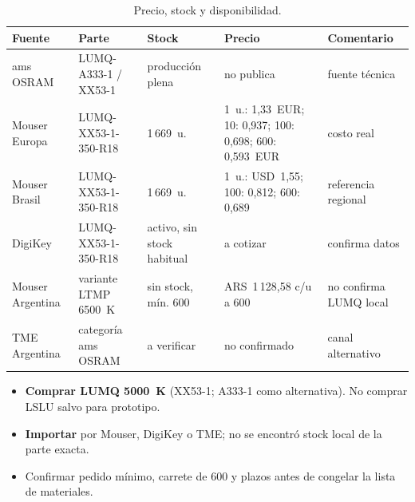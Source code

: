 \documentclass[11pt,a4paper]{article}
\begin{document}
\begin{table}[H]\centering\scriptsize\setlength{\tabcolsep}{3pt}
\begin{tabular}{p{2.1cm} p{3.3cm} p{2.4cm} p{4.2cm} p{2.4cm}}
\toprule
Fuente & Parte & Stock & Precio & Comentario\\
\midrule
ams OSRAM & LUMQ-A333-1 / XX53-1 & producción plena & no publica & fuente técnica\\
Mouser Europa & LUMQ-XX53-1-350-R18 & 1\,669~u. & 1~u.: 1,33~EUR; 10: 0,937; 100: 0,698; 600: 0,593~EUR & costo real\\
Mouser Brasil & LUMQ-XX53-1-350-R18 & 1\,669~u. & 1~u.: USD~1,55; 100: 0,812; 600: 0,689 & referencia regional\\
DigiKey & LUMQ-XX53-1-350-R18 & activo, sin stock habitual & a cotizar & confirma datos\\
Mouser Argentina & variante LTMP 6500~K & sin stock, mín. 600 & ARS~1\,128,58 c/u a 600 & no confirma LUMQ local\\
TME Argentina & categoría ams OSRAM & a verificar & no confirmado & canal alternativo\\
\bottomrule
\end{tabular}
\caption{Precio, stock y disponibilidad.}
\end{table}

\begin{itemize}
  \item \textbf{Comprar LUMQ 5000~K} (XX53-1; A333-1 como alternativa). No comprar LSLU salvo para prototipo.
  \item \textbf{Importar} por Mouser, DigiKey o TME; no se encontró stock local de la parte exacta.
  \item Confirmar pedido mínimo, carrete de 600 y plazos antes de congelar la lista de materiales.
\end{itemize}

\end{document}
